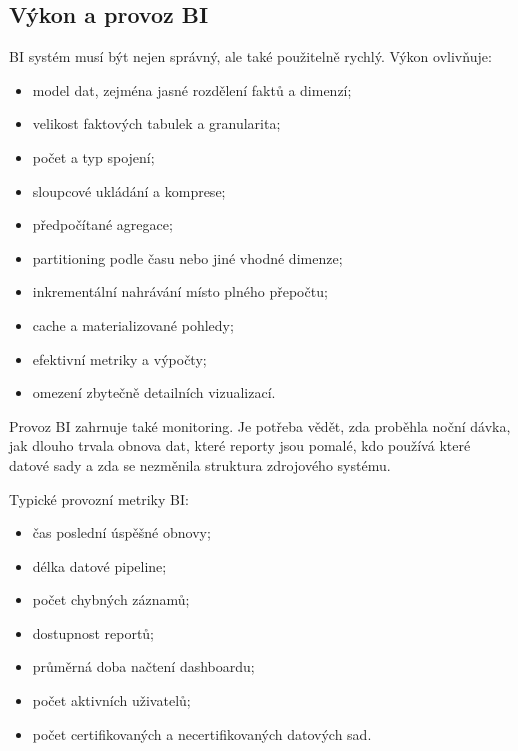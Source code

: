 \subsection{Výkon a provoz BI}
BI systém musí být nejen správný, ale také použitelně rychlý. Výkon ovlivňuje:
\begin{itemize}
  \item model dat, zejména jasné rozdělení faktů a dimenzí;
  \item velikost faktových tabulek a granularita;
  \item počet a typ spojení;
  \item sloupcové ukládání a komprese;
  \item předpočítané agregace;
  \item partitioning podle času nebo jiné vhodné dimenze;
  \item inkrementální nahrávání místo plného přepočtu;
  \item cache a materializované pohledy;
  \item efektivní metriky a výpočty;
  \item omezení zbytečně detailních vizualizací.
\end{itemize}

Provoz BI zahrnuje také monitoring. Je potřeba vědět, zda proběhla noční dávka, jak dlouho trvala obnova dat, které reporty jsou pomalé, kdo používá které datové sady a zda se nezměnila struktura zdrojového systému.

Typické provozní metriky BI:
\begin{itemize}
  \item čas poslední úspěšné obnovy;
  \item délka datové pipeline;
  \item počet chybných záznamů;
  \item dostupnost reportů;
  \item průměrná doba načtení dashboardu;
  \item počet aktivních uživatelů;
  \item počet certifikovaných a necertifikovaných datových sad.
\end{itemize}

